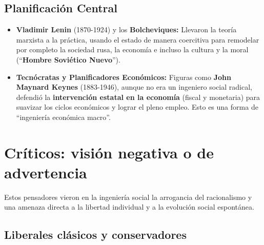 \documentclass[
  letterpaper,
  DIV=11,
  numbers=noendperiod]{scrreprt}
\providecommand{\tightlist}{%
  \setlength{\itemsep}{0pt}\setlength{\parskip}{0pt}}\usepackage{longtable,booktabs,array}
\begin{document}
\subsection{Planificación Central}\label{planificaciuxf3n-central}

\begin{itemize}
\tightlist
\item
  \textbf{Vladimir Lenin} (1870-1924) y los \textbf{Bolcheviques:}
  Llevaron la teoría marxista a la práctica, usando el estado de manera
  coercitiva para remodelar por completo la sociedad rusa, la economía e
  incluso la cultura y la moral (``\textbf{Hombre Soviético Nuevo}'').
\item
  \textbf{Tecnócratas y Planificadores Económicos:} Figuras como
  \textbf{John Maynard Keynes} (1883-1946), aunque no era un ingeniero
  social radical, defendió la \textbf{intervención estatal en la
  economía} (fiscal y monetaria) para suavizar los ciclos económicos y
  lograr el pleno empleo. Esto es una forma de ``ingeniería económica
  macro''.
\end{itemize}

\section{Críticos: visión negativa o de
advertencia}\label{cruxedticos-visiuxf3n-negativa-o-de-advertencia}

Estos pensadores vieron en la ingeniería social la arrogancia del
racionalismo y una amenaza directa a la libertad individual y a la
evolución social espontánea.

\subsection{Liberales clásicos y
conservadores}\label{liberales-cluxe1sicos-y-conservadores}
\end{document}
